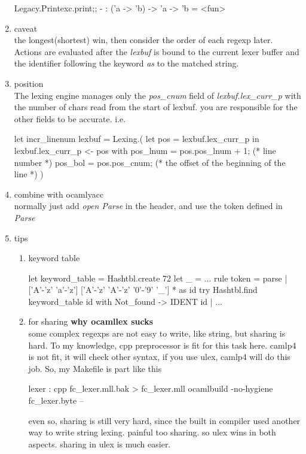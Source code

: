\begin{enumerate}
\begin{bluetext}
{}
    
\end{bluetext}

\begin{alternate}
Legacy.Printexc.print;;
- : ('a -> 'b) -> 'a -> 'b = <fun>  
\end{alternate}
\item caveat \\
  the longest(shortest) win, then consider the order of each regexp
  later.
  Actions are evaluated after the \textit{lexbuf} is bound to the
  current lexer buffer and the identifier following the keyword
  \textit{as} to the matched string.
\item position \\
  The lexing engine manages only the \textit{pos\_cnum} field of
  \textit{lexbuf.lex\_curr\_p} with the number of chars read from the
  start of lexbuf. you are responsible for the other fields to be
  accurate.
  i.e.
  \begin{bluetext}
let incr_linenum lexbuf = Lexing.(
    let pos = lexbuf.lex_curr_p in
    lexbuf.lex_curr_p <- { pos with
      pos_lnum = pos.pos_lnum + 1; (* line number *)
     pos_bol = pos.pos_cnum; (* the offset of the beginning of the
     line *)
    })    
  \end{bluetext}

\item combine with ocamlyacc \\
normally  just add \textit{open Parse} in the header, and use the
token defined in \textit{Parse}

\item tips \\
  \begin{enumerate}
  \item keyword table
    \begin{bluetext}
      {let keyword_table = Hashtbl.create 72
       let _ = ...
     }
     rule token = parse
     | ['A'-'z' 'a'-'z'] ['A'-'z' 'A'-'z' '0'-'9' '_'] * as id
     {try Hashtbl.find keyword_table id with Not_found -> IDENT id}
     | ... 
    \end{bluetext}
  \item for sharing \textbf{why ocamllex sucks}\\
    some complex regexps are not easy to write, like string, but sharing
    is hard. To my knowledge, cpp preprocessor is fit for this task here.
    camlp4 is not fit, it will check other syntax, if you use ulex, camlp4
    will do this job.
    So, my Makefile is part like this
    \begin{bluetext}
lexer : 
	cpp fc_lexer.mll.bak > fc_lexer.mll 
	ocamlbuild -no-hygiene fc_lexer.byte --       
    \end{bluetext}
    even so, sharing is still very hard, since the built in compiler used another way to write string lexing. painful too sharing. so ulex wins in both aspects.
    sharing in ulex is much easier.
  \end{enumerate}

  
\end{enumerate}


